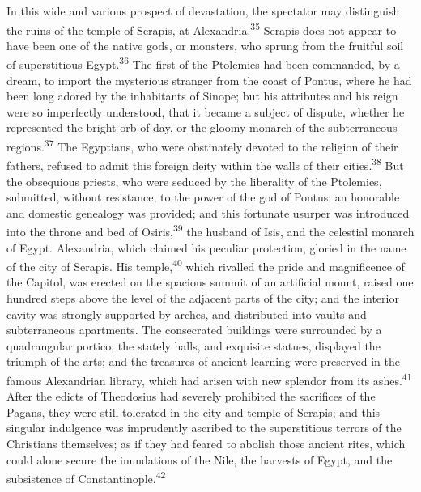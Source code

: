 In this wide and various prospect of devastation, the spectator
may distinguish the ruins of the temple of Serapis, at
Alexandria.\textsuperscript{35} Serapis does not appear to have been one of the
native gods, or monsters, who sprung from the fruitful soil of
superstitious Egypt.\textsuperscript{36} The first of the Ptolemies had been
commanded, by a dream, to import the mysterious stranger from the
coast of Pontus, where he had been long adored by the inhabitants
of Sinope; but his attributes and his reign were so imperfectly
understood, that it became a subject of dispute, whether he
represented the bright orb of day, or the gloomy monarch of the
subterraneous regions.\textsuperscript{37} The Egyptians, who were obstinately
devoted to the religion of their fathers, refused to admit this
foreign deity within the walls of their cities.\textsuperscript{38} But the
obsequious priests, who were seduced by the liberality of the
Ptolemies, submitted, without resistance, to the power of the god
of Pontus: an honorable and domestic genealogy was provided; and
this fortunate usurper was introduced into the throne and bed of
Osiris,\textsuperscript{39} the husband of Isis, and the celestial monarch of
Egypt. Alexandria, which claimed his peculiar protection, gloried
in the name of the city of Serapis. His temple,\textsuperscript{40} which rivalled
the pride and magnificence of the Capitol, was erected on the
spacious summit of an artificial mount, raised one hundred steps
above the level of the adjacent parts of the city; and the
interior cavity was strongly supported by arches, and distributed
into vaults and subterraneous apartments. The consecrated
buildings were surrounded by a quadrangular portico; the stately
halls, and exquisite statues, displayed the triumph of the arts;
and the treasures of ancient learning were preserved in the
famous Alexandrian library, which had arisen with new splendor
from its ashes.\textsuperscript{41} After the edicts of Theodosius had severely
prohibited the sacrifices of the Pagans, they were still
tolerated in the city and temple of Serapis; and this singular
indulgence was imprudently ascribed to the superstitious terrors
of the Christians themselves; as if they had feared to abolish
those ancient rites, which could alone secure the inundations of
the Nile, the harvests of Egypt, and the subsistence of
Constantinople.\textsuperscript{42}


